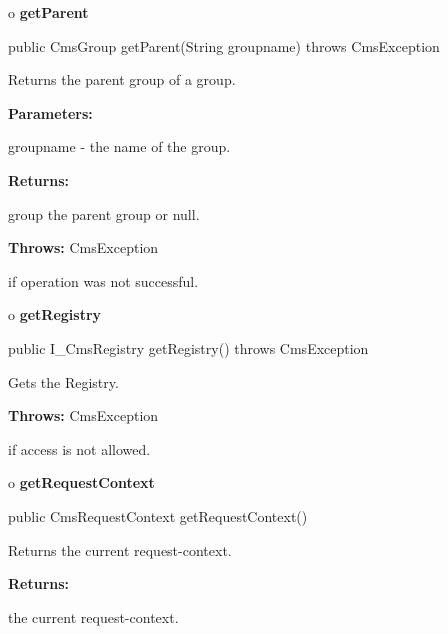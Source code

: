o {\bf getParent} 

\begin{PRE}
 public CmsGroup getParent(String groupname) throws CmsException
\end{PRE}

\begin{description}
\htmlDD Returns the parent group of a group. 

\begin{description}
\item {\bf Parameters:}  

groupname - the name of the group.  
\item {\bf Returns:}  

group the parent group or null.  
\item {\bf Throws:} CmsException  

if operation was not successful.  
\end{description}

\end{description}

o {\bf getRegistry} 

\begin{PRE}
 public I\_CmsRegistry getRegistry() throws CmsException
\end{PRE}

\begin{description}
\htmlDD Gets the Registry. 

\begin{description}
\item {\bf Throws:} CmsException  

if access is not allowed.  
\end{description}

\end{description}

o {\bf getRequestContext} 

\begin{PRE}
 public CmsRequestContext getRequestContext()
\end{PRE}

\begin{description}
\htmlDD Returns the current request-context. 

\begin{description}
\item {\bf Returns:}  

the current request-context.  
\end{description}

\end{description}

